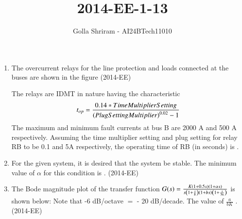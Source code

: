 \documentclass[journal,12pt,twocolumn]{IEEEtran}
\theoremstyle{remark}
\begin{document}
\onecolumn


\vspace{3cm}
\title{ 2014-EE-1-13 }
\author{Golla Shriram - AI24BTech11010}

\maketitle

\renewcommand{\thefigure}{\theenumi}
\renewcommand{\thetable}{\theenumi}

                                                                           
 \begin{enumerate}[start=53]
		 
	 \item The overcurrent relays for the line protection and loads connected at the buses are shown in the figure \hfill{(2014-EE)}
     \begin{center}

\end{center}


	 
The relays are IDMT in nature having the characteristic
$$  t_{op} = \frac{0.14 * Time Multiplier Setting}{\left(Plug Setting Multiplier\right)^{0.02}-1}        $$
The maximum and minimum fault currents at bus B are 2000 A and 500 A respectively. Assuming
the time multiplier setting and plug setting for relay RB to be 0.1 and 5A respectively, the operating
time of RB  (in seconds) is \underline{\hspace{2.5 cm}}.

\item For the given system, it is desired that the system be stable. The minimum value of $\alpha$ for this
condition is \underline{\hspace{2.5 cm}}. \hfill{(2014-EE)}

\begin{center}

\end{center}




\item The Bode magnitude plot of the transfer function $G(s) =\frac{K\left(1+0.5s\right)\left(1+\alpha s\right) }{s\left(1+\frac{s}{8}\right)\left(1+bs\right)\left(1+\frac{s}{36}\right) }$ is shown below:
Note that -6 dB/octave $=$ - 20 dB/decade. The value of $\frac{a}{bK}$ \underline{\hspace{2.5 cm}}.  \hfill{(2014-EE)} 


\begin{center}

\end{center}



\end{enumerate}
\end{document}

